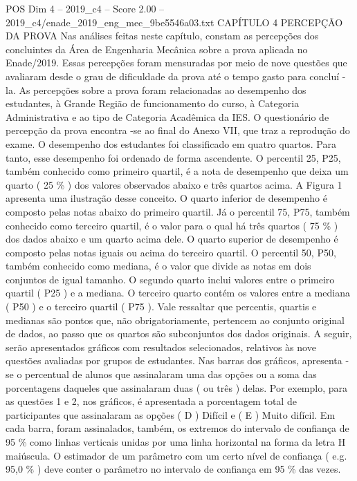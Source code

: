 \begin{textsample}{POS Dim 4 – 2019\_c4 – Score 2.00 – 2019\_c4/enade\_2019\_eng\_mec\_9be5546a03.txt}  \label{ex:f4_pos_116}
CAPÍTULO 4 PERCEPÇÃO DA PROVA Nas análises feitas neste capítulo, constam as percepções dos concluintes da Área de Engenharia Mecânica sobre a prova aplicada no Enade/2019.
Essas percepções foram mensuradas por meio de nove questões que avaliaram desde o grau de dificuldade da prova até o tempo gasto para concluí -la.
As percepções sobre a prova foram relacionadas ao desempenho dos estudantes, à Grande Região de funcionamento do curso, à Categoria Administrativa e ao tipo de Categoria Acadêmica da IES.
O questionário de percepção da prova encontra -se ao final do Anexo VII, que traz a reprodução do exame.
O desempenho dos estudantes foi classificado em quatro quartos.
Para tanto, esse desempenho foi ordenado de forma ascendente.
O percentil 25, P25, também conhecido como primeiro quartil, é a nota de desempenho que deixa um quarto ( 25 \% ) dos valores observados abaixo e três quartos acima.
A Figura 1 apresenta uma ilustração desse conceito.
O quarto inferior de desempenho é composto pelas notas abaixo do primeiro quartil.
Já o percentil 75, P75, também conhecido como terceiro quartil, é o valor para o qual há três quartos ( 75 \% ) dos dados abaixo e um quarto acima dele.
O quarto superior de desempenho é composto pelas notas iguais ou acima do terceiro quartil.
O percentil 50, P50, também conhecido como mediana, é o valor que divide as notas em dois conjuntos de igual tamanho.
O segundo quarto inclui valores entre o primeiro quartil ( P25 ) e a mediana.
O terceiro quarto contém os valores entre a mediana ( P50 ) e o terceiro quartil ( P75 ).
Vale ressaltar que percentis, quartis e medianas são pontos que, não obrigatoriamente, pertencem ao conjunto original de dados, ao passo que os quartos são subconjuntos dos dados originais.
A seguir, serão apresentados gráficos com resultados selecionados, relativos às nove questões avaliadas por grupos de estudantes.
Nas barras dos gráficos, apresenta -se o percentual de alunos que assinalaram uma das opções ou a soma das porcentagens daqueles que assinalaram duas ( ou três ) delas.
Por exemplo, para as questões 1 e 2, nos gráficos, é apresentada a porcentagem total de participantes que assinalaram as opções ( D ) Difícil e ( E ) Muito difícil.
Em cada barra, foram assinalados, também, os extremos do intervalo de confiança de 95 \% como linhas verticais unidas por uma linha horizontal na forma da letra H maiúscula.
O estimador de um parâmetro com um certo nível de confiança ( e.g. 95,0 \% ) deve conter o parâmetro no intervalo de confiança em 95 \% das vezes.

\end{textsample}
